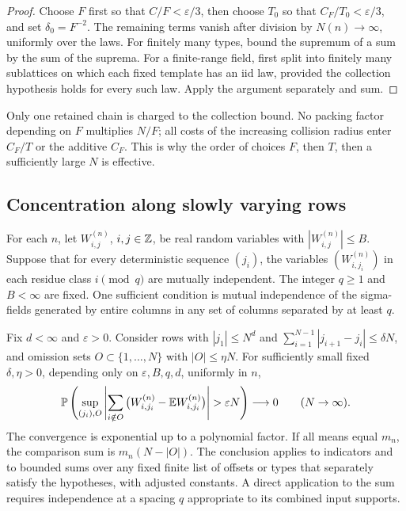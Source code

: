 \begin{proof}
Choose $F$ first so that $C/F<\varepsilon/3$, then choose $T_0$
so that $C_F/T_0<\varepsilon/3$, and set $\delta_0=F^{-2}$.
The remaining terms vanish after division by $N(n)\to\infty$,
uniformly over the laws.  For finitely many types, bound the
supremum of a sum by the sum of the suprema.  For a finite-range
field, first split into finitely many sublattices on which each
fixed template has an iid law, provided the collection hypothesis
holds for every such law.  Apply the argument separately and sum.
\end{proof}

Only one retained chain is charged to the collection bound.  No
packing factor depending on $F$ multiplies $N/F$; all costs of
the increasing collision radius enter $C_F/T$ or the additive
$C_F$.  This is why the order of choices $F$, then $T$, then a
sufficiently large $N$ is effective.

\subsection{Concentration along slowly varying rows}

\begin{lemma}
\label{probability:rows}
For each $n$, let $W^{(n)}_{i,j}$, $i,j\in\mathbb Z$, be real random
variables with $|W^{(n)}_{i,j}|\le B$.  Suppose that for every
deterministic sequence $(j_i)$, the variables
$(W^{(n)}_{i,j_i})$ in each residue class $i\pmod q$ are mutually
independent.  The integer $q\ge1$ and $B<\infty$ are fixed.
One sufficient condition is mutual independence of the sigma-fields
generated by entire columns in any set of columns separated by at
least $q$.

Fix $d<\infty$ and $\varepsilon>0$.  Consider rows with
$|j_1|\le N^d$ and
$\sum_{i=1}^{N-1}|j_{i+1}-j_i|\le\delta N$, and omission
sets $O\subset\{1,\ldots,N\}$ with $|O|\le\eta N$.
For sufficiently small fixed $\delta,\eta>0$, depending only on
$\varepsilon,B,q,d$, uniformly in $n$,
\begin{equation}
 \PP\left(
  \sup_{(j_i),O}\left|
    \sum_{i\notin O}\big(W^{(n)}_{i,j_i}
                         -\E W^{(n)}_{i,j_i}\big)
                        \right|>\varepsilon N\right)
 \longrightarrow0\qquad(N\to\infty).
 \label{probability:row-concentration}
\end{equation}
The convergence is exponential up to a polynomial factor.  If
all means equal $m_n$, the comparison sum is $m_n(N-|O|)$.
The conclusion applies to indicators and to bounded sums over any
fixed finite list of offsets or types that separately satisfy the
hypotheses, with adjusted constants.  A direct application to the
sum requires independence at a spacing $q$ appropriate to its
combined input supports.
\end{lemma}

